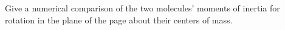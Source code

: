 Give a numerical comparison of the two molecules' moments
of inertia for rotation in the plane of the page about their
centers of mass.\answercheck
